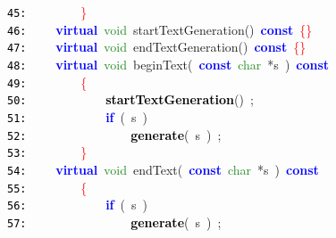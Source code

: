 \documentclass{article}
\begin{document}
\mbox{}\texttt{\textcolor{Black}{45:}} \ \ \ \ \ \ \ \ \textcolor{Red}{\}} \\
\mbox{}\texttt{\textcolor{Black}{46:}} \ \ \ \ \textbf{\textcolor{Blue}{virtual}}\ \textcolor{ForestGreen}{void}\ \label{test.h:46}startTextGeneration\textcolor{BrickRed}{()}\ \textbf{\textcolor{Blue}{const}}\ \textcolor{Red}{\{\}} \\
\mbox{}\texttt{\textcolor{Black}{47:}} \ \ \ \ \textbf{\textcolor{Blue}{virtual}}\ \textcolor{ForestGreen}{void}\ \label{test.h:47}endTextGeneration\textcolor{BrickRed}{()}\ \textbf{\textcolor{Blue}{const}}\ \textcolor{Red}{\{\}} \\
\mbox{}\texttt{\textcolor{Black}{48:}} \ \ \ \ \textbf{\textcolor{Blue}{virtual}}\ \textcolor{ForestGreen}{void}\ \label{test.h:48}beginText\textcolor{BrickRed}{(}\ \textbf{\textcolor{Blue}{const}}\ \textcolor{ForestGreen}{char}\ \textcolor{BrickRed}{*}s\ \textcolor{BrickRed}{)}\ \textbf{\textcolor{Blue}{const}} \\
\mbox{}\texttt{\textcolor{Black}{49:}} \ \ \ \ \ \ \ \ \textcolor{Red}{\{} \\
\mbox{}\texttt{\textcolor{Black}{50:}} \ \ \ \ \ \ \ \ \ \ \ \ \textbf{\textcolor{Black}{startTextGeneration}}\textcolor{BrickRed}{()}\ \textcolor{BrickRed}{;} \\
\mbox{}\texttt{\textcolor{Black}{51:}} \ \ \ \ \ \ \ \ \ \ \ \ \textbf{\textcolor{Blue}{if}}\ \textcolor{BrickRed}{(}\ s\ \textcolor{BrickRed}{)} \\
\mbox{}\texttt{\textcolor{Black}{52:}} \ \ \ \ \ \ \ \ \ \ \ \ \ \ \ \ \textbf{\textcolor{Black}{generate}}\textcolor{BrickRed}{(}\ s\ \textcolor{BrickRed}{)}\ \textcolor{BrickRed}{;} \\
\mbox{}\texttt{\textcolor{Black}{53:}} \ \ \ \ \ \ \ \ \textcolor{Red}{\}} \\
\mbox{}\texttt{\textcolor{Black}{54:}} \ \ \ \ \textbf{\textcolor{Blue}{virtual}}\ \textcolor{ForestGreen}{void}\ \label{test.h:54}endText\textcolor{BrickRed}{(}\ \textbf{\textcolor{Blue}{const}}\ \textcolor{ForestGreen}{char}\ \textcolor{BrickRed}{*}s\ \textcolor{BrickRed}{)}\ \textbf{\textcolor{Blue}{const}} \\
\mbox{}\texttt{\textcolor{Black}{55:}} \ \ \ \ \ \ \ \ \textcolor{Red}{\{} \\
\mbox{}\texttt{\textcolor{Black}{56:}} \ \ \ \ \ \ \ \ \ \ \ \ \textbf{\textcolor{Blue}{if}}\ \textcolor{BrickRed}{(}\ s\ \textcolor{BrickRed}{)} \\
\mbox{}\texttt{\textcolor{Black}{57:}} \ \ \ \ \ \ \ \ \ \ \ \ \ \ \ \ \textbf{\textcolor{Black}{generate}}\textcolor{BrickRed}{(}\ s\ \textcolor{BrickRed}{)}\ \textcolor{BrickRed}{;} \\
\end{document}
